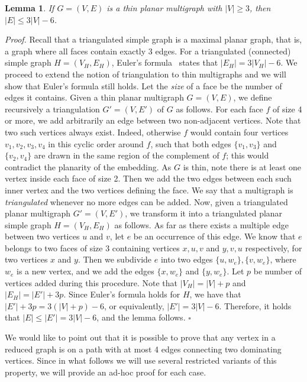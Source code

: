 \documentclass[a4paper,11pt]{article}
\newtheorem{lem}  {Lemma}
\newenvironment{proof}{\noindent \textit{Proof. }}{\hfill$\square$\vspace{.2cm}}
\begin{document}
\begin{lem}\label{fait_thin}
If $G=(V,E)$ is a thin planar multigraph with $|V| \geq 3$, then $|E| \leq 3|V| -6$.
\end{lem}

\begin{proof}
Recall that a triangulated simple graph is a maximal planar graph, that is, a graph where all faces contain exactly 3 edges.
For a triangulated (connected) simple graph $H=(V_H,E_H)$, Euler's formula~\cite{Die05} states that  $|E_H| =  3|V_H| - 6$. We proceed to extend the notion of triangulation to thin multigraphs and we will show that Euler's formula still holds.
Let the \emph{size} of a face be the number of edges it contains. Given a thin planar multigraph $G=(V,E)$, we define recursively a triangulation $G'=(V,E')$ of $G$ as follows. For each face $f$ of size 4 or more, we add arbitrarily an edge between two non-adjacent vertices. Note that two such vertices always exist. Indeed, otherwise $f$ would contain four vertices $v_1,v_2,v_3,v_4$ in this cyclic order around $f$, such that both edges $\{v_1,v_3\}$ and $\{v_2,v_4\}$ are drawn in the same region of the complement of $f$; this would contradict the planarity of the embedding. As $G$ is thin, note there is at least one vertex inside each face of size 2. Then we add the two edges between each such inner vertex and the two vertices defining the face. We say that a multigraph is \emph{triangulated} whenever no more edges can be added.
Now, given a triangulated planar multigraph $G'=(V,E')$, we transform it into a triangulated planar simple graph $H=(V_H,E_H)$ as follows. As far as there exists a multiple edge between two vertices $u$ and $v$, let $e$ be an occurrence  of this edge. We know that $e$ belongs to two faces of size 3 containing vertices $x,u,v$ and $y,v,u$ respectively, for two vertices $x$ and $y$. Then we subdivide $e$ into two edges $\{u,w_e\}, \{v,w_e\}$, where $w_e$ is a new vertex, and we add the edges $\{x,w_e\}$ and  $\{y,w_e\}$. Let $p$ be number of vertices added during this procedure. Note that $|V_H| = |V| + p$ and $|E_H| = |E'| + 3p$. Since Euler's formula holds for $H$, we have that $|E'| + 3p = 3(|V| + p) - 6$, or equivalently, $|E'| = 3|V|  - 6$. Therefore, it holds that $|E| \leq |E'| = 3|V|  - 6$, and the lemma follows.
\end{proof}


We would like to point out that it is possible to prove that any vertex in a reduced graph is on a path with at most 4 edges connecting two dominating vertices. Since in what follows we will use several restricted variants of this property, we will provide an ad-hoc proof for each case.
\end{document}

